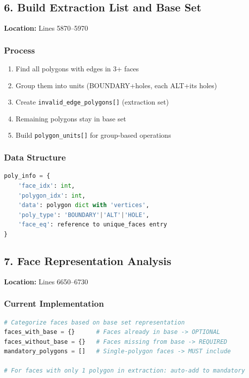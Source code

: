 \documentclass[11pt]{article}
\begin{document}
\subsection{6. Build Extraction List and Base Set}
\textbf{Location:} Lines 5870--5970

\subsubsection{Process}
\begin{enumerate}
    \item Find all polygons with edges in 3+ faces
    \item Group them into units (BOUNDARY+holes, each ALT+its holes)
    \item Create \texttt{invalid\_edge\_polygons[]} (extraction set)
    \item Remaining polygons stay in base set
    \item Build \texttt{polygon\_units[]} for group-based operations
\end{enumerate}

\subsubsection{Data Structure}
\begin{lstlisting}[language=Python]
poly_info = {
    'face_idx': int,
    'polygon_idx': int,
    'data': polygon dict with 'vertices',
    'poly_type': 'BOUNDARY'|'ALT'|'HOLE',
    'face_eq': reference to unique_faces entry
}
\end{lstlisting}

\subsection{7. Face Representation Analysis}
\textbf{Location:} Lines 6650--6730

\subsubsection{Current Implementation}
\begin{lstlisting}[language=Python]
# Categorize faces based on base set representation
faces_with_base = {}      # Faces already in base -> OPTIONAL
faces_without_base = {}   # Faces missing from base -> REQUIRED
mandatory_polygons = []   # Single-polygon faces -> MUST include

# For faces with only 1 polygon in extraction: auto-add to mandatory
\end{lstlisting}
\end{document}
